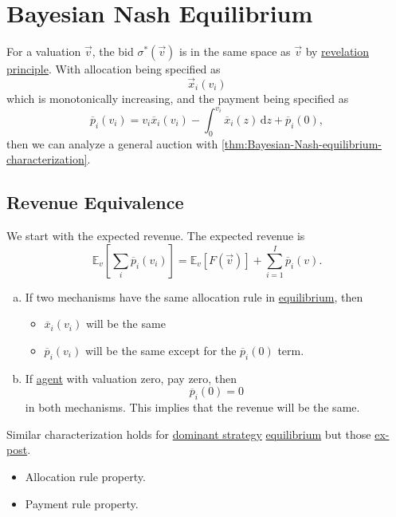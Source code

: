 \section{Bayesian Nash Equilibrium}
\begin{prev}
	For a valuation \(\vec{v}\), the bid \(\sigma^{\ast}(\vec{v})\) is in the same space as \(\vec{v}\) by \hyperref[thm:revelation-principle]{revelation principle}. With allocation being specified as
	\[
		\vec{x}_{i}(v_{i})
	\]
	which is monotonically increasing, and the payment being specified as
	\[
		\overline{p}_{i}(v_{i}) = v_{i}\overline{x}_{i}(v_{i}) - \int_0^{v_{i}}\overline{x}_{i}(z)\,\mathrm{d}z + \overline{p}_{i}(0),
	\]
	then we can analyze a general auction with \autoref{thm:Bayesian-Nash-equilibrium-characterization}.
\end{prev}

\subsection{Revenue Equivalence}
We start with the expected revenue. The expected revenue is
\[
	\mathbb{E}_{v}\left[\sum\limits_{i}\overline{p}_{i}(v_{i}) \right] = \mathbb{E}_{v}\left[F(\vec{v})\right] + \sum\limits_{i=1}^{I} \overline{p}_{i}(v).
\]
\begin{enumerate}[(a)]
	\item If two mechanisms have the same allocation rule in \hyperref[def:Nash-equilibrium]{equilibrium}, then
	      \begin{itemize}
		      \item \(\overline{x}_{i}(v_{i})\) will be the same
		      \item \(\overline{p}_{i}(v_{i})\) will be the same except for the \(\overline{p}_{i}(0)\) term.
	      \end{itemize}
	\item If \hyperref[def:player]{agent} with valuation zero, pay zero, then
	      \[
		      \overline{p}_{i}(0) = 0
	      \]
	      in both mechanisms. This implies that the revenue will be the same.
\end{enumerate}

\begin{note}
	Similar characterization holds for \hyperref[def:dominant-strategy]{dominant strategy} \hyperref[def:Nash-equilibrium]{equilibrium} but those \hyperref[def:ex-post]{ex-post}.
	\begin{itemize}
		\item Allocation rule property.
		\item Payment rule property.
	\end{itemize}
\end{note}

